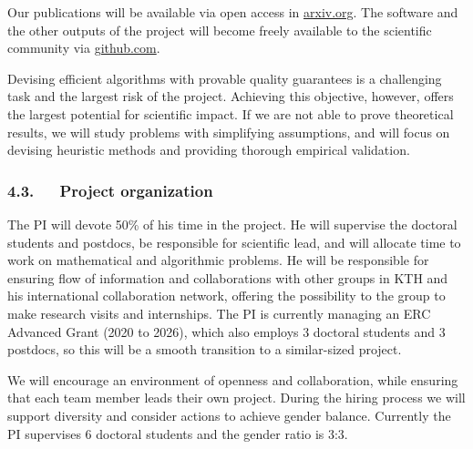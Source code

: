 \documentclass[a4paper,11pt]{article}
\begin{document}
Our publications will be available via open access in {\small\url{arxiv.org}}. 
The software and the other outputs of the project 
will become freely available to the scientific community via {\small\url{github.com}}.

Devising efficient algorithms with provable quality guarantees is a challenging task
and the largest risk of the project. 
Achieving this objective, however, offers the largest potential for scientific impact.
If we are not able to prove theoretical results, 
we will study problems with simplifying assumptions, and 
will focus on devising heuristic methods and providing thorough empirical validation.

\subsubsection*{4.3.~~~Project organization}
\vspace{-1mm}


The PI will devote 50\% of his time in the project. 
He will supervise the doctoral students and postdocs, 
be responsible for scientific lead, 
and will allocate time to work on mathematical and algorithmic problems.
He will be responsible for ensuring flow of information and collaborations
with other groups in KTH and his international collaboration network, 
offering the possibility to the group to make research visits and internships.
The PI is currently managing an ERC Advanced Grant (2020 to 2026),
which also employs 3 doctoral students and 3 postdocs, 
so this will be a smooth transition to a similar-sized project.

We will encourage an environment of openness and collaboration, 
while ensuring that each team member leads their own project.
%
During the hiring process we will support diversity and consider actions to achieve gender balance. 
Currently the PI supervises 6 doctoral students and the gender ratio is 3:3.
\end{document}
